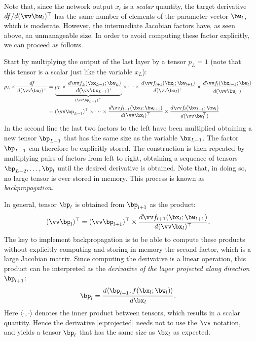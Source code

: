 Note that, since the network output $x_l$ is a \emph{scalar} quantity, the target derivative $df/d(\vv \bw_l)^\top$ has the same number of elements of the parameter vector $\bw_l$, which is moderate. However, the intermediate Jacobian factors have, as seen above, an unmanageable size. In order to avoid computing these factor explicitly, we can proceed as follows.

Start by multiplying the output of the last layer by a tensor $p_L=1$ (note that this tensor is a scalar just like the variable $x_L$):
\begin{align*}
p_L \times \frac{df}{d(\vv \bw_l)^\top} 
&= 
\underbrace{p_L \times \frac{d\vv f_L(\bx_{L-1};\bw_{L})}{d(\vv\bx_{L-1})^\top}}_{(\vv \bp_{L-1})^\top}
\times
\dots
\times
\frac{d\vv f_{l+1}(\bx_{l};\bw_{l+1})}{d(\vv\bx_{l})^\top}
\times
\frac{d\vv f_l(\bx_{l-1};\bw_{l})}{d(\vv\bw_l^\top)}
\\
&=
(\vv \bp_{L-1})^\top
\times
\dots
\times
\frac{d\vv f_{l+1}(\bx_{l};\bw_{l+1})}{d(\vv\bx_{l})^\top}
\times
\frac{d\vv f_l(\bx_{l-1};\bw_{l})}{d(\vv\bw_l^\top)}
\end{align*}
In the second line the last two factors to the left have been multiplied obtaining a new tensor $\bp_{L-1}$ that has the same size as the variable $\bx_{L-1}$. The factor $\bp_{L-1}$ can therefore be explicitly stored. The construction is then repeated by multiplying pairs of factors from left to right, obtaining a sequence of tensors $\bp_{L-2},\dots,\bp_{l}$ until the desired derivative is obtained. Note that, in doing so, no large tensor is ever stored in memory. This process is known as \emph{backpropagation}.

In general, tensor $\bp_{l}$ is obtained from $\bp_{l+1}$ as the product:
\[
(\vv \bp_{l})^\top = (\vv \bp_{l+1})^\top \times \frac{d\vv f_{l+1}(\bx_{l};\bw_{l+1})}{d(\vv\bx_{l})^\top}.
\]
The key to implement backpropagation is to be able to compute these products without explicitly computing and storing in memory the second factor, which is a large Jacobian matrix. Since computing the derivative is a linear operation, this product can be interpreted as the \emph{derivative of the layer projected along direction $\bp_{l+1}$}: 
\begin{equation}\label{e:projected}
\bp_{l} = 
\frac{d \langle \bp_{l+1}, f(\bx_l;\bw_l) \rangle}
{d \bx_{l}}.
\end{equation}
Here $\langle \cdot,\cdot \rangle$ denotes the inner product between tensors, which results in a scalar quantity. Hence the derivative \eqref{e:projected} needs not to use the $\vv$ notation, and yields a tensor $\bp_l$ that has the same size as $\bx_l$ as expected.

